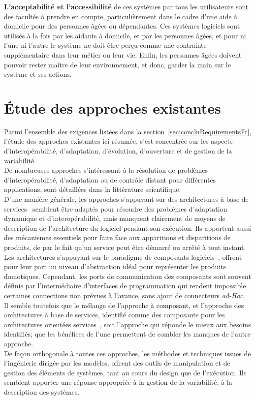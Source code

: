 {\bf L'acceptabilité et l'accessibilité} de ces systèmes par tous les utilisateurs sont des facultés à prendre en compte, particulièrement dans le cadre d'une aide à domicile pour des personnes âgées ou dépendantes. Ces systèmes logiciels sont utilisés à la fois par les aidants à domicile, et par les personnes âgées, et pour ni l'une ni l'autre le système ne doit être perçu comme une contrainte supplémentaire dans leur métier ou leur vie. Enfin, les personnes âgées doivent pouvoir rester maître de leur environnement, et donc, garder la main sur le système et ses actions.\\


\section{Étude des approches existantes}

Parmi l'ensemble des exigences listées dans la section~\ref{sec:concluRequirementsFr}, l'étude des approches existantes ici résumée, s'est concentrée sur les aspects d'interopérabilité, d'adaptation, d'évolution, d'ouverture et de gestion de la variabilité.\\

De nombreuses approches s'intéressant à la résolution de problèmes d'interopérabilité, d'adaptation ou de contrôle distant pour différentes applications, sont détaillées dans la littérature scientifique.\\
D'une manière générale, les approches s'appuyant sur des architectures à base de services~\cite{OSGI:r4,ESB} semblent être adaptés pour résoudre des problèmes d'adaptation dynamique et d'interopérabilité, mais manquent clairement de moyens de description de l'architecture du logiciel pendant son exécution. Ils apportent aussi des mécanismes essentiels pour faire face aux apparitions et disparitions de produits, de par le fait qu'un service peut être démarré ou arrêté à tout instant.\\
Les architectures s'appuyant sur le paradigme de composants logiciels~\cite{Georgiadis:2002,RobVanOmmering:2000,Bruneton:2006}, offrent pour leur part un niveau d'abstraction idéal pour représenter les produits domotiques. Cependant, les ports de communication des composants sont souvent définis par l'intermédiaire d'interfaces de programmation qui rendent impossible certaines connections non prévues à l'avance, sans ajout de connecteurs {\it ad-Hoc}.\\
Il semble toutefois que le mélange de l'approche à composant, et l'approche des architectures à base de services, identifié comme des composants pour les architectures orientées services~\cite{sca:specs,Melisson:2010,Escoffier:2007}, soit l'approche qui réponde le mieux aux besoins identifiés; que les bénéfices de l'une permettent de combler les manques de l'autre approche.\\
De façon orthogonale à toutes ces approches, les méthodes et techniques issues de l'ingénierie dirigée par les modèles, offrent des outils de manipulation et de gestion des éléments de systèmes, tant au cours du design que de l'exécution. Ils semblent apporter une réponse appropriée à la gestion de la variabilité, à la description des systèmes.\\

